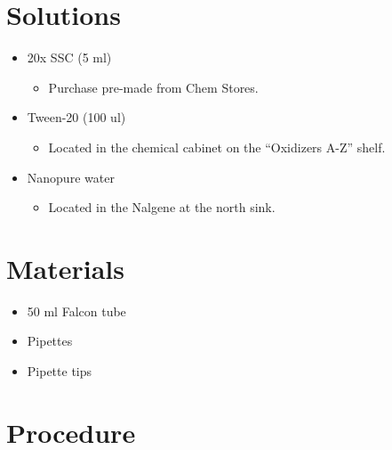 \documentclass[
  letterpaper,
  DIV=11,
  numbers=noendperiod]{scrreprt}
\providecommand{\tightlist}{%
  \setlength{\itemsep}{0pt}\setlength{\parskip}{0pt}}\usepackage{longtable,booktabs,array}
\begin{document}
\hypertarget{solutions-84}{%
\section{Solutions}\label{solutions-84}}

\begin{itemize}
\tightlist
\item
  20x SSC (5 ml)

  \begin{itemize}
  \tightlist
  \item
    Purchase pre-made from Chem Stores.
  \end{itemize}
\item
  Tween-20 (100 ul)

  \begin{itemize}
  \tightlist
  \item
    Located in the chemical cabinet on the ``Oxidizers A-Z'' shelf.
  \end{itemize}
\item
  Nanopure water

  \begin{itemize}
  \tightlist
  \item
    Located in the Nalgene at the north sink.
  \end{itemize}
\end{itemize}

\hypertarget{materials-93}{%
\section{Materials}\label{materials-93}}

\begin{itemize}
\tightlist
\item
  50 ml Falcon tube
\item
  Pipettes
\item
  Pipette tips
\end{itemize}

\hypertarget{procedure-93}{%
\section{Procedure}\label{procedure-93}}
\end{document}
